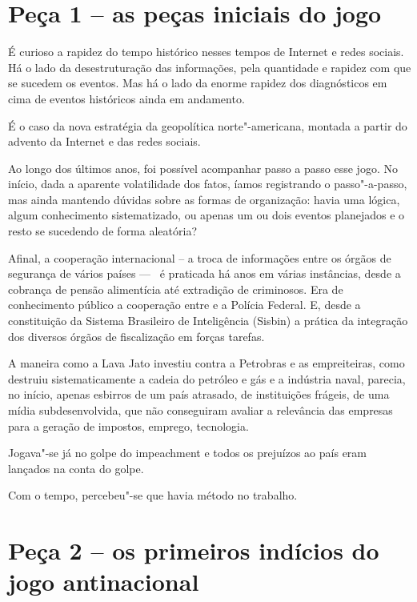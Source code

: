  

\section{Peça 1 -- as peças iniciais do jogo}

É curioso a rapidez do tempo histórico nesses tempos de Internet e redes
sociais. Há o lado da desestruturação das informações, pela quantidade e
rapidez com que se sucedem os eventos. Mas há o lado da enorme rapidez
dos diagnósticos em cima de eventos históricos ainda em andamento.

É o caso da nova estratégia da geopolítica norte"-americana, montada a
partir do advento da Internet e das redes sociais.

Ao longo dos últimos anos, foi possível acompanhar passo a passo esse
jogo. No início, dada a aparente volatilidade dos fatos, íamos
registrando o passo"-a-passo, mas ainda mantendo dúvidas sobre as formas
de organização: havia uma lógica, algum conhecimento sistematizado, ou
apenas um ou dois eventos planejados e o resto se sucedendo de forma
aleatória?

Afinal, a cooperação internacional -- a troca de informações entre os
órgãos de segurança de vários países --- ~é praticada há anos em várias
instâncias, desde a cobrança de pensão alimentícia até extradição de
criminosos. Era de conhecimento público a cooperação entre  e a
Polícia Federal. E, desde a constituição da Sistema Brasileiro de
Inteligência (Sisbin) a prática da integração dos diversos órgãos de
fiscalização em forças tarefas.

A maneira como a Lava Jato investiu contra a Petrobras e as
empreiteiras, como destruiu sistematicamente a cadeia do petróleo e gás
e a indústria naval, parecia, no início, apenas esbirros de um país
atrasado, de instituições frágeis, de uma mídia subdesenvolvida, que não
conseguiram avaliar a relevância das empresas para a geração de
impostos, emprego, tecnologia.

Jogava"-se já no golpe do impeachment e todos os prejuízos ao país eram
lançados na conta do golpe.

Com o tempo, percebeu"-se que havia método no trabalho.

\section{Peça 2 -- os primeiros indícios do jogo
antinacional~~~~~~~~~~~~~}

